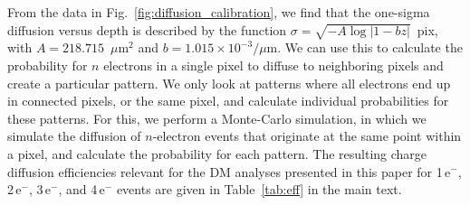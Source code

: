 \documentclass[aps,prl,twocolumn,showpacs,superscriptaddress,preprintnumbers]{revtex4-1}
\newcommand{\unit}[1]{\ensuremath{\mathrm{\,#1}}\xspace}
\newcommand{\e}{\unit{e^{-}}}
\begin{document}
From the data in Fig.~\ref{fig:diffusion_calibration}, we find that the one-sigma diffusion versus depth is described by the function 
$\sigma = \sqrt{-A\log|1-bz|}$~pix, with $A=218.715$~$\mu$m$^2$ and $b=1.015\times 10^{-3}/\mu$m. 
We can use this to calculate the probability for $n$ electrons in a single pixel to diffuse to neighboring pixels and create a particular pattern. 
We only look at patterns where all electrons end up in connected pixels, or the same pixel, and calculate individual probabilities for these patterns. For this, we perform a Monte-Carlo simulation, in which we simulate the diffusion of $n$-electron events that originate at the same point within a pixel, and calculate the probability for each pattern. 
The resulting charge diffusion efficiencies relevant for the DM analyses presented in this paper for 1\e, 2\e, 3\e, and 4\e events are given in Table~\ref{tab:eff} in the main text. 
\end{document}
